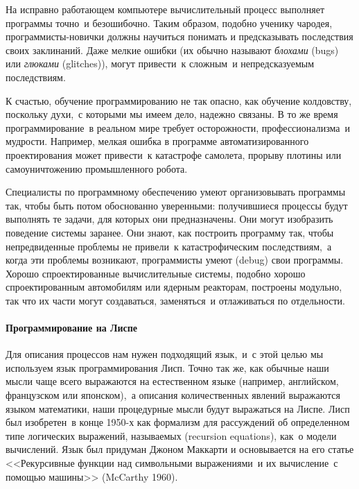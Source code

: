На исправно работающем компьютере вычислительный процесс
выполняет программы точно~и безошибочно. Таким образом, подобно
ученику чародея, про\-грам\-мис\-ты-но\-вич\-ки должны научиться понимать и
предсказывать последствия своих заклинаний.  Даже мелкие ошибки
(их обычно называют {\em блохами} (bugs)
или {\em глюками} (glitches)), могут привести~к сложным~и 
непредсказуемым последствиям.

К счастью, обучение программированию не так опасно, как
обучение колдовству, поскольку духи,~с которыми мы имеем дело, надежно
связаны.  В то же время программирование~в реальном мире
требует осторожности, профессионализма~и мудрости.  Например, мелкая
ошибка в программе автоматизированного проектирования может привести~к 
катастрофе самолета, прорыву плотины или самоуничтожению промышленного 
робота.

Специалисты по программному обеспечению умеют организовывать
программы так, чтобы быть потом обоснованно уверенными: 
получившиеся процессы будут выполнять те задачи, для которых они
предназначены.  Они могут изобразить поведение системы заранее.  Они
знают, как построить программу так, чтобы непредвиденные проблемы не
привели~к катастрофическим последствиям,~а когда эти проблемы
возникают, программисты умеют  (debug) свои
программы.
Хорошо спроектированные вычислительные системы, подобно хорошо
спроектированным автомобилям или ядерным реакторам, построены модульно, 
так что их части могут создаваться, заменяться~и отлаживаться по
отдельности.

\paragraph{Программирование на Лиспе}


Для описания процессов нам нужен подходящий язык,~и~с этой 
целью мы используем язык программирования Лисп.  Точно так же, как
обычные наши мысли чаще всего выражаются на естественном языке
(например, английском, французском или японском),~а описания
количественных явлений выражаются языком математики, наши процедурные
мысли будут выражаться на Лиспе.  Лисп был изобретен~в конце 1950-х как
формализм для рассуждений об определенном типе логических выражений,
называемых  (recursion   equations), как~о модели
вычислений.  Язык был придуман Джоном Маккарти
и основывается на его
статье <<Рекурсивные функции над символьными выражениями~и их
вычисление~с помощью машины>> (McCarthy 1960).

